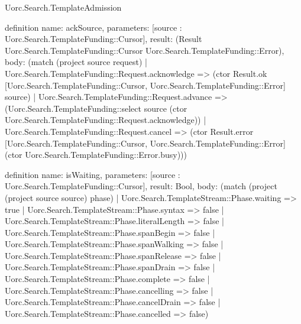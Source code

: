 \begin{lexlean}{Uorc.Search.TemplateAdmission}
\begin{semanticmodule}
definition{
  name: ackSource,
  parameters: [source : Uorc.Search.TemplateFunding::Cursor],
  result: (Result Uorc.Search.TemplateFunding::Cursor Uorc.Search.TemplateFunding::Error),
  body: (match (project source request)
    | Uorc.Search.TemplateFunding::Request.acknowledge => (ctor Result.ok [Uorc.Search.TemplateFunding::Cursor, Uorc.Search.TemplateFunding::Error] source)
    | Uorc.Search.TemplateFunding::Request.advance => (Uorc.Search.TemplateFunding::select source (ctor Uorc.Search.TemplateFunding::Request.acknowledge))
    | Uorc.Search.TemplateFunding::Request.cancel => (ctor Result.error [Uorc.Search.TemplateFunding::Cursor, Uorc.Search.TemplateFunding::Error] (ctor Uorc.Search.TemplateFunding::Error.busy)))
}

definition{
  name: isWaiting,
  parameters: [source : Uorc.Search.TemplateFunding::Cursor],
  result: Bool,
  body: (match (project (project source source) phase)
    | Uorc.Search.TemplateStream::Phase.waiting => true
    | Uorc.Search.TemplateStream::Phase.syntax => false
    | Uorc.Search.TemplateStream::Phase.literalLength => false
    | Uorc.Search.TemplateStream::Phase.spanBegin => false
    | Uorc.Search.TemplateStream::Phase.spanWalking => false
    | Uorc.Search.TemplateStream::Phase.spanRelease => false
    | Uorc.Search.TemplateStream::Phase.spanDrain => false
    | Uorc.Search.TemplateStream::Phase.complete => false
    | Uorc.Search.TemplateStream::Phase.cancelling => false
    | Uorc.Search.TemplateStream::Phase.cancelDrain => false
    | Uorc.Search.TemplateStream::Phase.cancelled => false)
}


\end{semanticmodule}
\end{lexlean}
